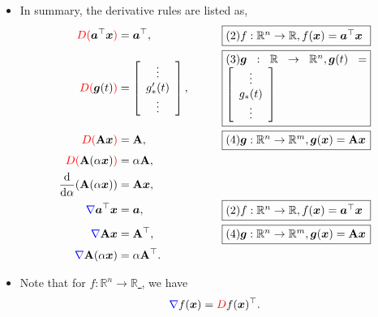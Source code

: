 \begin{itemize}
	\item In summary, the derivative rules are listed as,
	\begin{align*}
		{\color{red} D(} \boldsymbol{a}^{\top} \boldsymbol{x} {\color{red})} 
		&= \boldsymbol{a}^{\top}, \qquad &
		\fbox{\parbox{0.36\textwidth}{\( (2) f: \mathbb{R}^{n} \rightarrow \mathbb{R}, f(\boldsymbol{x}) =  \boldsymbol{a}^{\top} \boldsymbol{x} \)}} \\
		{\color{red} D(} \boldsymbol{g}(t) {\color{red})} 
		&= \left[ \begin{array}{c} \vdots \\ g_{*}'(t) \\ \vdots \end{array} \right], \qquad &
		\fbox{\parbox{0.36\textwidth}{\( (3) \boldsymbol{g}: \mathbb{R} \rightarrow \mathbb{R}^{n}, \boldsymbol{g}(t) =  \left[ \begin{array}{c} \vdots \\ g_{*}(t) \\ \vdots \end{array} \right] \)}} \\
		{\color{red} D(} \mathbf{A} \boldsymbol{x} {\color{red})} 
		&= {\color{black} \mathbf{A}}, \qquad &
		\fbox{\parbox{0.36\textwidth}{\( (4) \boldsymbol{g}: \mathbb{R}^{n} \rightarrow \mathbb{R}^{m}, \boldsymbol{g}(\boldsymbol{x}) =  \mathbf{A} \boldsymbol{x} \)}} \\
		{\color{red} D(} \mathbf{A}(\alpha \boldsymbol{x}) {\color{red})} 
		&= {\color{black} \alpha \mathbf{A}}, \\
		\frac{\mathrm{d}}{\mathrm{d} \alpha}( {\color{black}\mathbf{A}(\alpha \boldsymbol{x})} ) &= {\color{black} \mathbf{A} \boldsymbol{x}}, \\
		{\color{blue}\nabla} \boldsymbol{a}^{\top} \boldsymbol{x} 
		&= \boldsymbol{a},  \qquad & 
		\fbox{\parbox{0.36\textwidth}{\( (2) f: \mathbb{R}^{n} \rightarrow \mathbb{R}, f(\boldsymbol{x}) =  \boldsymbol{a}^{\top} \boldsymbol{x} \)}} \\
		{\color{blue}\nabla} \mathbf{A} \boldsymbol{x} 
		&= \mathbf{A}^{\top}, \qquad & 
		\fbox{\parbox{0.36\textwidth}{\( (4) \boldsymbol{g}: \mathbb{R}^{n} \rightarrow \mathbb{R}^{m}, \boldsymbol{g}(\boldsymbol{x}) =  \mathbf{A} \boldsymbol{x} \)}} \\
		{\color{blue}\nabla} \mathbf{A}(\alpha \boldsymbol{x}) 
		&=  \alpha \mathbf{A}^{\top}. \\
	\end{align*}

	\item Note that for \underline{ \(f: \mathbb{R}^n \rightarrow \mathbb{R}\) }, we have
	\[
	{\color{blue} \nabla} f(\boldsymbol{x})={\color{red} D} f(\boldsymbol{x})^{\top}.
	\]
\end{itemize}

